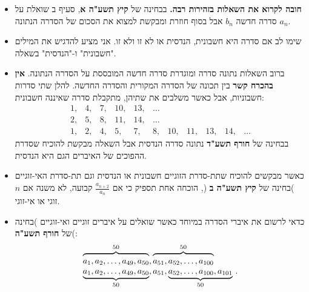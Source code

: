 \documentclass[12pt,a4paper]{article}
\begin{document}
\begin{itemize}


\item
\textbf{חובה לקרוא את השאלות בזהירות רבה.}
בבחינה של
\textbf{קיץ תשע"ה א},
סעיף ב שואלת על סדרה חדשה
${b_n}$
אבל בסוף חוזרת ומבקשת למצוא את הסכום של הסדרה הנתונה
${a_n}$.

\item
שימו לב אם סדרה היא חשבונית, הנדסית או לא זו ולא זו. אני מציע להדגיש את המילים "חשבונית" ו-"הנדסית" בשאלה.

\item 
ברוב השאלות נתונה סדרה ומוגדרת סדרה חדשה המובססת על הסדרה הנתונה. 
\textbf{אין בהכרח קשר}
בין תכונה של הסדרה המקורית והסדרה החדשה. להלן שתי סדרות חשבוניות, אבל כאשר משלבים את שתיהן, מתקבלת סדרה שאיננה חשבונית:
\[
\begin{array}{rrrrrrrrrrr}
1,& 4,& 7,& 10,& 13,& \ldots\\
2,& 5,& 8,& 11,& 14, &\ldots\\
1,& 2,& 4,& 5,& 7,& 8,& 10,& 11,& 13,& 14, &\ldots
\end{array}
\]
בבחינה של
\textbf{חורף תשע"ד}
נתונה סדרה הנדסית אבל השאלה מבקשת להוכיח שסדרת ההפוכים של האיברים הגם היא הנדסית.

\item
כאשר מבקשים להוכיח שתת-סדרת הזוגיים חשבונית או הנדסית וגם תת-סדרת האי-זוגיים )בחינה של
\textbf{קיץ תשע"ה ב}%
(, הוכחה אחת תספיק כי אם 
$\displaystyle \frac{a_{n+2}}{a_n}$
קבועה, לא משנה אם 
$n$
זוגי או אי-זוגי.


\item

כדאי לרשום את איברי הסדרה במיוחד כאשר שואלים על איברים זוגיים ואי-זוגיים )בחינה של
\textbf{חורף תשע"ה}(:
\[
\begin{array}{l}
\overbrace{\rule{0pt}{8pt}a_1, a_2, \ldots, a_{49}, a_{50}}^{50}, \overbrace{\rule{0pt}{8pt}a_{51}, a_{52},\ldots, a_{100}}^{50}\\
\underbrace{\rule{0pt}{8pt}a_1, a_2, \ldots, a_{49}, a_{50}}_{50}, a_{51}, \underbrace{\rule{0pt}{8pt}a_{52}, \ldots, a_{100}, a_{101}}_{50}\,.
\end{array}
\]
\vspace{-4ex}


\end{itemize}
\end{document}
